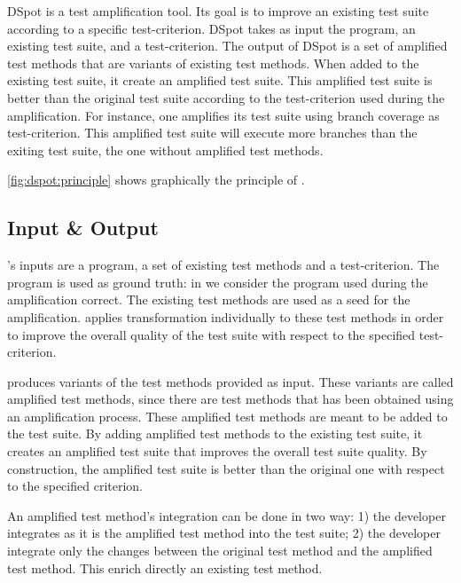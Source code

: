 DSpot is a test amplification tool.
Its goal is to improve an existing test suite according to a specific test-criterion.
DSpot takes as input the program, an existing test suite, and a test-criterion. 
The output of DSpot is a set of amplified test methods that are variants of existing test methods.
When added to the existing test suite, it create an amplified test suite.
This amplified test suite is better than the original test suite according to the test-criterion used during the amplification.
For instance, one amplifies its test suite using branch coverage as test-criterion.
This amplified test suite will execute more branches than the exiting test suite, \ie the one without amplified test methods.

\autoref{fig:dspot:principle} shows graphically the principle of \dspot.

\subsection{Input \& Output}
\label{subsec:dspot:overview:input-and-output}

\dspot's inputs are a program, a set of existing test methods and a test-criterion.
The program is used as ground truth: in \dspot we consider the program used during the amplification correct.
The existing test methods are used as a seed for the amplification.
\dspot applies transformation individually to these test methods in order to improve the overall quality of the test suite with respect to the specified test-criterion.

\dspot produces variants of the test methods provided as input.
These variants are called amplified test methods, since there are test methods that has been obtained using an amplification process.
These amplified test methods are meant to be added to the test suite.
By adding amplified test methods to the existing test suite, it creates an amplified test suite that improves the overall test suite quality.
By construction, the amplified test suite is better than the original one with respect to the specified criterion.

An amplified test method's integration can be done in two way:
1) the developer integrates as it is the amplified test method into the test suite;
2) the developer integrate only the changes between the original test method and the amplified test method.
This enrich directly an existing test method.

